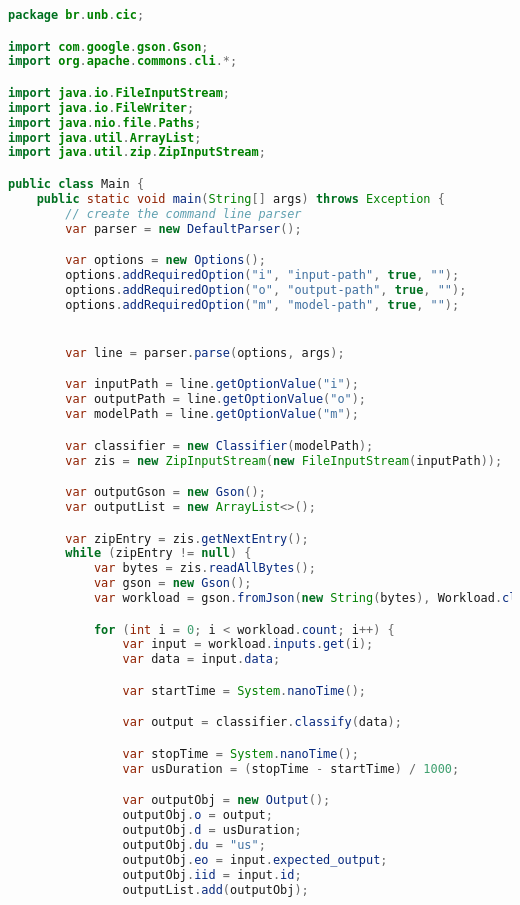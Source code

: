 \begin{lstlisting}[language=Java, caption=Classe principal de execução das medições em Java]
package br.unb.cic;

import com.google.gson.Gson;
import org.apache.commons.cli.*;

import java.io.FileInputStream;
import java.io.FileWriter;
import java.nio.file.Paths;
import java.util.ArrayList;
import java.util.zip.ZipInputStream;

public class Main {
    public static void main(String[] args) throws Exception {
        // create the command line parser
        var parser = new DefaultParser();

        var options = new Options();
        options.addRequiredOption("i", "input-path", true, "");
        options.addRequiredOption("o", "output-path", true, "");
        options.addRequiredOption("m", "model-path", true, "");


        var line = parser.parse(options, args);

        var inputPath = line.getOptionValue("i");
        var outputPath = line.getOptionValue("o");
        var modelPath = line.getOptionValue("m");

        var classifier = new Classifier(modelPath);
        var zis = new ZipInputStream(new FileInputStream(inputPath));

        var outputGson = new Gson();
        var outputList = new ArrayList<>();

        var zipEntry = zis.getNextEntry();
        while (zipEntry != null) {
            var bytes = zis.readAllBytes();
            var gson = new Gson();
            var workload = gson.fromJson(new String(bytes), Workload.class);

            for (int i = 0; i < workload.count; i++) {
                var input = workload.inputs.get(i);
                var data = input.data;

                var startTime = System.nanoTime();

                var output = classifier.classify(data);

                var stopTime = System.nanoTime();
                var usDuration = (stopTime - startTime) / 1000;

                var outputObj = new Output();
                outputObj.o = output;
                outputObj.d = usDuration;
                outputObj.du = "us";
                outputObj.eo = input.expected_output;
                outputObj.iid = input.id;
                outputList.add(outputObj);


\end{lstlisting}
